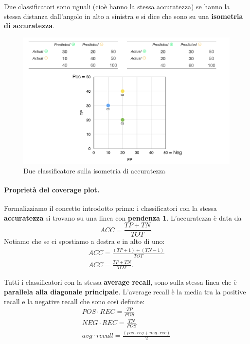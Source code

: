 Due classificatori sono uguali (cioè hanno la stessa accuratezza) se hanno la stessa distanza dall'angolo in alto a sinistra e si dice che sono su una \textbf{isometria di accuratezza}.

\begin{figure}
    \centering
    \includegraphics[scale=0.45]{images/accIso.png}
    \caption{Due classificatore sulla isometria di accuratezza}
    \label{fig:enter-label}
\end{figure}

\newpage

\paragraph{Proprietà del coverage plot.} Formalizziamo il concetto introdotto prima: i classificatori con la stessa \textbf{accuratezza} si trovano su una linea con \textbf{pendenza 1}.
L'accuratezza è data da
\begin{equation}
    ACC = \frac{TP+TN}{TOT}.
\end{equation}
Notiamo che se ci spostiamo a destra e in alto di uno:
\begin{equation}
\begin{split}
    ACC = \frac{(TP+1)+(TN-1)}{TOT} \\
    ACC = \frac{TP+TN}{TOT}.
\end{split}
\end{equation}

Tutti i classificatori con la stessa \textbf{average recall}, sono sulla stessa linea che è \textbf{parallela alla diagonale principale}. L'average recall è la media tra la positive recall e la negative recall che sono così definite:
\begin{equation}
\begin{split}
    POS\cdot REC=\frac{TP}{POS}   \\
    NEG\cdot REC=\frac{TN}{POS}   \\
    avg\cdot recall = \frac{(pos\cdot reg+neg\cdot rec)}{2}
\end{split}
\end{equation}

